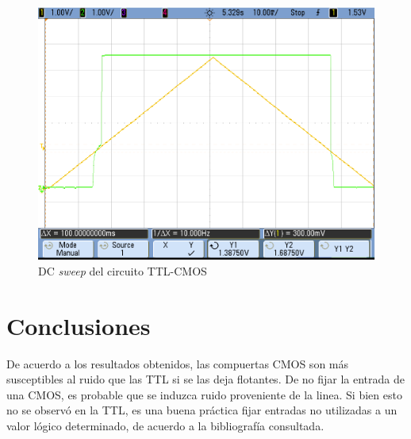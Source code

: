 \documentclass[../../e3_tp2_main.tex]{subfiles}
\begin{document}
\begin{figure}[H]
	\centering
	\includegraphics[scale=0.3]{../mediciones/e3_tp2_5_1.png}
	\caption{DC \textit{sweep} del circuito TTL-CMOS}
\end{figure}



\section{Conclusiones}

De acuerdo a los resultados obtenidos, las compuertas CMOS son m\'as susceptibles al ruido que las TTL si se las deja flotantes. De no fijar la entrada de una CMOS, es probable que se induzca ruido proveniente de la linea. Si bien esto no se observ\'o en la TTL, es una buena pr\'actica fijar entradas no utilizadas a un valor l\'ogico determinado, de acuerdo a la bibliograf\'ia consultada.
\end{document}
